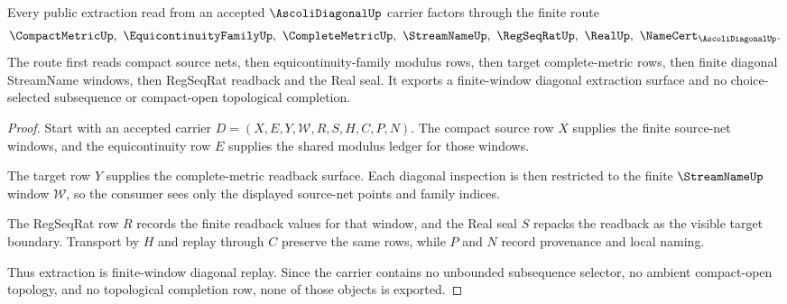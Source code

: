 \begin{theorem}
\label{thm:ascoli-diagonal-finite-window-extraction}
Every public extraction read from an accepted $\AscoliDiagonalUp$ carrier
factors through the finite route
$$
\CompactMetricUp,\ \EquicontinuityFamilyUp,\ \CompleteMetricUp,\ \StreamNameUp,\ \RegSeqRatUp,\ \RealUp,\ \NameCert_{\AscoliDiagonalUp}.
$$
The route first reads compact source nets, then equicontinuity-family modulus
rows, then target complete-metric rows, then finite diagonal StreamName
windows, then RegSeqRat readback and the Real seal. It exports a finite-window
diagonal extraction surface and no choice-selected subsequence or compact-open
topological completion.
\end{theorem}
\begin{proof}
Start with an accepted carrier $D=(X,E,Y,\mathcal{W},R,S,H,C,P,N)$. The compact
source row $X$ supplies the finite source-net windows, and the equicontinuity
row $E$ supplies the shared modulus ledger for those windows.

The target row $Y$ supplies the complete-metric readback surface. Each diagonal
inspection is then restricted to the finite $\StreamNameUp$ window
$\mathcal{W}$, so the consumer sees only the displayed source-net points and
family indices.

The RegSeqRat row $R$ records the finite readback values for that window, and
the Real seal $S$ repacks the readback as the visible target boundary. Transport
by $H$ and replay through $C$ preserve the same rows, while $P$ and $N$ record
provenance and local naming.

Thus extraction is finite-window diagonal replay. Since the carrier contains no
unbounded subsequence selector, no ambient compact-open topology, and no
topological completion row, none of those objects is exported.
\end{proof}


\begin{closurestatus}{\AscoliDiagonalUp}
  \theoryclosure{\seedClosure}
  \formalstatus{\unformalizedV}
\end{closurestatus}
